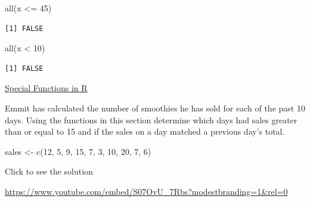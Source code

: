 \documentclass[
  letterpaper,
  DIV=11,
  numbers=noendperiod]{scrreprt}
\newenvironment{Shaded}{\begin{snugshade}}{\end{snugshade}}
\newcommand{\DecValTok}[1]{\textcolor[rgb]{0.68,0.00,0.00}{#1}}
\newcommand{\FunctionTok}[1]{\textcolor[rgb]{0.28,0.35,0.67}{#1}}
\newcommand{\NormalTok}[1]{\textcolor[rgb]{0.00,0.23,0.31}{#1}}
\newcommand{\OtherTok}[1]{\textcolor[rgb]{0.00,0.23,0.31}{#1}}
\newcommand{\SpecialCharTok}[1]{\textcolor[rgb]{0.37,0.37,0.37}{#1}}
\begin{document}
\begin{Shaded}
\begin{Highlighting}[]
\FunctionTok{all}\NormalTok{(x }\SpecialCharTok{\textless{}=} \DecValTok{45}\NormalTok{)}
\end{Highlighting}
\end{Shaded}

\begin{verbatim}
[1] FALSE
\end{verbatim}

\begin{Shaded}
\begin{Highlighting}[]
\FunctionTok{all}\NormalTok{(x }\SpecialCharTok{\textless{}} \DecValTok{10}\NormalTok{)}
\end{Highlighting}
\end{Shaded}

\begin{verbatim}
[1] FALSE
\end{verbatim}

\begin{watch}{}{}
    \href{https://youtu.be/46XJpsU2A6k}{Special Functions in R}
\end{watch}

\begin{tcolorbox}[enhanced jigsaw, colframe=quarto-callout-tip-color-frame, colback=white, breakable, rightrule=.15mm, title=\textcolor{quarto-callout-tip-color}{\faLightbulb}\hspace{0.5em}{Try it Out}, bottomtitle=1mm, toptitle=1mm, titlerule=0mm, left=2mm, coltitle=black, colbacktitle=quarto-callout-tip-color!10!white, leftrule=.75mm, opacitybacktitle=0.6, bottomrule=.15mm, opacityback=0, arc=.35mm, toprule=.15mm]

Emmit has calculated the number of smoothies he has sold for each of the
past 10 days. Using the functions in this section determine which days
had sales greater than or equal to 15 and if the sales on a day matched
a previous day's total.

\begin{Shaded}
\begin{Highlighting}[]
\NormalTok{sales }\OtherTok{\textless{}{-}} \FunctionTok{c}\NormalTok{(}\DecValTok{12}\NormalTok{, }\DecValTok{5}\NormalTok{, }\DecValTok{9}\NormalTok{, }\DecValTok{15}\NormalTok{, }\DecValTok{7}\NormalTok{, }\DecValTok{3}\NormalTok{, }\DecValTok{10}\NormalTok{, }\DecValTok{20}\NormalTok{, }\DecValTok{7}\NormalTok{, }\DecValTok{6}\NormalTok{)}
\end{Highlighting}
\end{Shaded}

Click to see the solution

\url{https://www.youtube.com/embed/S07OvU_7Rbs?modestbranding=1&rel=0}

\end{tcolorbox}
\end{document}
